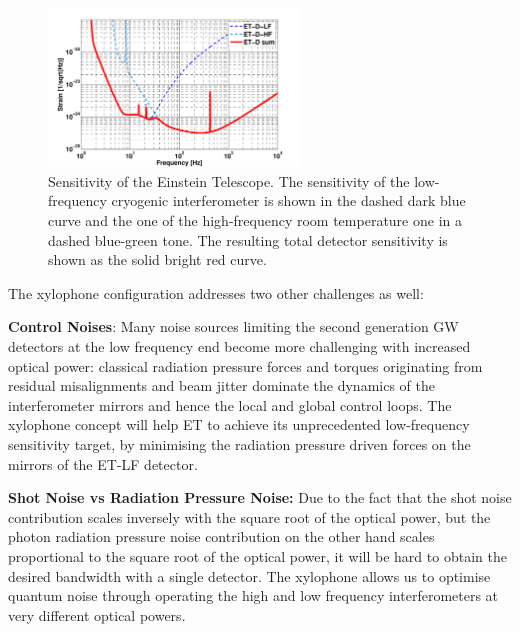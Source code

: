 \begin{figure}[ht]
	\centering
		\includegraphics[width=0.6\textwidth]{Figures/ET_D_spectrum.pdf}
	\caption{Sensitivity of the Einstein Telescope. 
	The sensitivity of the low-frequency cryogenic interferometer is shown in the 
	dashed dark blue curve and the one of the high-frequency room temperature 
	one in a dashed blue-green tone. The resulting total detector sensitivity is
	shown as the solid bright red curve.}
	\label{fig:ET_sensitivity}
\end{figure}

The xylophone configuration addresses two other challenges as well:

\textbf{Control Noises}: Many noise sources limiting the second generation GW detectors at the low frequency end become more challenging with increased optical power: classical radiation pressure forces and torques originating from residual misalignments and beam jitter dominate the dynamics of the interferometer mirrors and hence the local and global control loops. 
The xylophone concept will help ET to achieve its unprecedented low-frequency sensitivity target, by minimising the radiation pressure driven forces on the mirrors of the ET-LF detector.

\textbf{Shot Noise vs Radiation Pressure Noise:} Due to the fact that the shot noise contribution scales inversely with the square root of the optical power, but the photon radiation pressure noise contribution on the other hand scales proportional to the square root of the optical power, it will be hard to obtain the desired bandwidth with a single detector.
The xylophone allows us to optimise quantum noise through operating the high and low frequency interferometers at very different optical powers.

